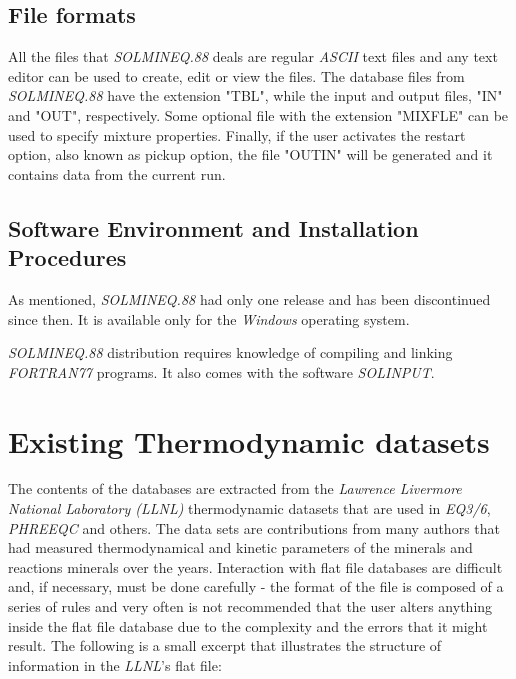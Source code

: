 \begin{enumerate}
\subsection{File formats}
All the files that \emph{SOLMINEQ.88} deals are regular \emph{ASCII} text files and any text editor can be used to create, edit or view the files. The database files from \emph{SOLMINEQ.88} have the extension "TBL", while the input and output files, "IN" and "OUT", respectively. 
Some optional file with the extension "MIXFLE" can be used to specify mixture properties. Finally, if the user activates the restart option, also known as pickup option, the file "OUTIN" will be generated and it contains data from the current run.

\subsection{Software Environment and Installation Procedures}
As mentioned, \emph{SOLMINEQ.88} had only one release and has been discontinued since then. It is available only for the \emph{Windows} operating system.

\emph{SOLMINEQ.88} distribution requires knowledge of compiling and linking \emph{FORTRAN77} programs. It also comes with the software \emph{SOLINPUT}.

\section{Existing Thermodynamic datasets}
The contents of the databases are extracted from the \emph{Lawrence Livermore National Laboratory (LLNL)} thermodynamic datasets that are used in \emph{EQ3/6}, \emph{PHREEQC} and others. The data sets are contributions from many authors that had measured thermodynamical and kinetic parameters of the minerals and reactions minerals over the years. Interaction with flat file databases are difficult and, if necessary, must be done carefully - the format of the file is composed of a series of rules and very often is not recommended that the user alters anything inside the flat file database due to the complexity and the errors that it might result. The following is a small excerpt that illustrates the structure of information in the \emph{LLNL}'s flat file:


\end{enumerate}
